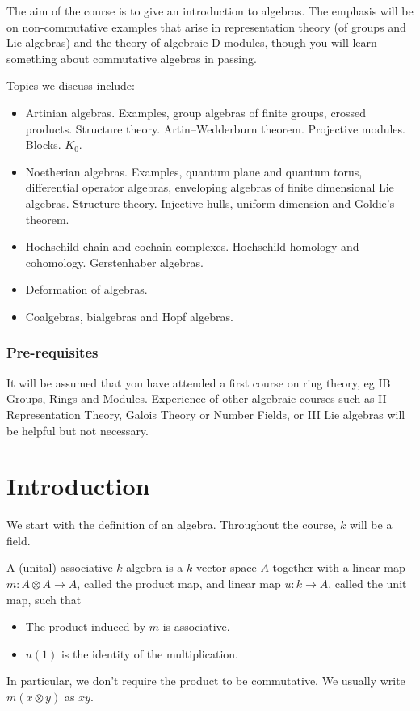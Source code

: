 \documentclass[a4paper]{article}
\begin{document}
\maketitle
{\small
\setlength{\parindent}{0em}
\setlength{\parskip}{1em}
The aim of the course is to give an introduction to algebras. The emphasis will be on non-commutative examples that arise in representation theory (of groups and Lie algebras) and the theory of algebraic D-modules, though you will learn something about commutative algebras in passing.

Topics we discuss include:

\begin{itemize}
  \item Artinian algebras. Examples, group algebras of finite groups, crossed products. Structure theory. Artin--Wedderburn theorem. Projective modules. Blocks. $K_0$.

  \item Noetherian algebras. Examples, quantum plane and quantum torus, differential operator algebras, enveloping algebras of finite dimensional Lie algebras. Structure theory. Injective hulls, uniform dimension and Goldie's theorem.

  \item Hochschild chain and cochain complexes. Hochschild homology and cohomology. Gerstenhaber algebras.

  \item Deformation of algebras.

  \item Coalgebras, bialgebras and Hopf algebras.
\end{itemize}

\subsubsection*{Pre-requisites}
It will be assumed that you have attended a first course on ring theory, eg IB Groups, Rings and Modules. Experience of other algebraic courses such as II Representation Theory, Galois Theory or Number Fields, or III Lie algebras will be helpful but not necessary.
}
\tableofcontents

\setcounter{section}{-1}
\section{Introduction}
We start with the definition of an algebra. Throughout the course, $k$ will be a field.
\begin{defi}[$k$-algebra]
  A (unital) associative $k$-algebra is a $k$-vector space $A$ together with a linear map $m: A \otimes A \to A$, called the product map, and linear map $u: k \to A$, called the unit map, such that
  \begin{itemize}
    \item The product induced by $m$ is associative.
    \item $u(1)$ is the identity of the multiplication.
  \end{itemize}
\end{defi}
In particular, we don't require the product to be commutative. We usually write $m(x \otimes y)$ as $xy$.
\end{document}
